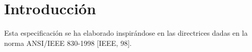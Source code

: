 \section{Introducción}

Esta especificación se ha elaborado inspirándose en las directrices dadas en la norma ANSI/IEEE 830-1998 [IEEE, 98].
